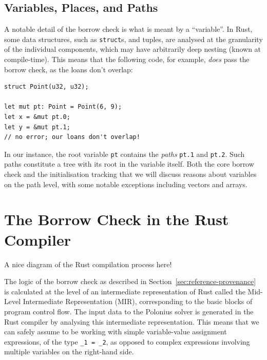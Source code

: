 \documentclass[11pt,a4paper,twoside,openany]{report}
\newcommand{\fixme}[1] {{\color{red}#1}}
\newcommand{\InRust}[1]{\texttt{#1}}
\begin{document}
\subsection{Variables, Places, and Paths}
\label{sec:vars-places-paths}

A notable detail of the borrow check is what is meant by a ``variable''. In
Rust, some data structures, such as \InRust{struct}s, and tuples, are analysed
at the granularity of the individual components, which may have arbitrarily deep
nesting (known at compile-time). This means that the following code, for
example, \emph{does} pass the borrow check, as the loans don't overlap:
\begin{verbatim}
struct Point(u32, u32);

let mut pt: Point = Point(6, 9);
let x = &mut pt.0;
let y = &mut pt.1;
// no error; our loans don't overlap!
\end{verbatim}

In our instance, the root variable \InRust{pt} contains the \emph{paths}
\InRust{pt.1} and \InRust{pt.2}. Such paths constitute a tree with its root in
the variable itself. Both the core borrow check and the initialisation tracking
that we will discuss reasons about variables on the path level, with some
notable exceptions including vectors and arrays.

\section{The Borrow Check in the Rust Compiler}
\label{sec:rust-specificts}

\fixme{A nice diagram of the Rust compilation process here!}

The logic of the borrow check as described in
Section~\ref{sec:reference-provenance} is calculated at the level of an
intermediate representation of Rust called the Mid-Level Intermediate
Representation (MIR), corresponding to the basic blocks of program control flow.
The input data to the Polonius solver is generated in the Rust compiler by
analysing this intermediate representation. This means that we can safely assume
to be working with simple variable-value assignment expressions, of the type
\InRust{_1 = _2}, as opposed to complex expressions involving multiple variables
on the right-hand side.
\end{document}
